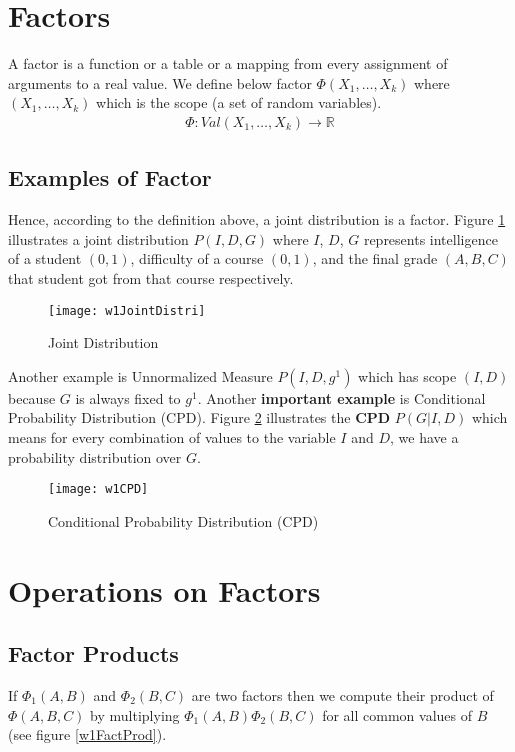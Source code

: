 \section{Factors}
A factor is a function or a table or a mapping from every assignment of arguments to a real value. We define below factor $\Phi(X_1, \ldots, X_k)$ where $(X_1, \ldots, X_k)$ which is the scope (a set of random variables).
\begin{align}
\Phi: Val(X_1, \ldots, X_k) \rightarrow \mathbb{R}
\end{align}

\subsection{Examples of Factor}
Hence, according to the definition above, a joint distribution is a factor. Figure \ref{w1JointDistri} illustrates a joint distribution $P(I,D,G)$ where $I$, $D$, $G$ represents intelligence of a student $(0, 1)$, difficulty of a course $(0,1)$, and the final grade $(A,B,C)$ that student got from that course respectively.
\begin{figure}[!ht]
\centering
\texttt{[image: w1JointDistri]}
\caption{Joint Distribution}
\label{w1JointDistri}
\end{figure}

Another example is Unnormalized Measure $P(I,D,g^1)$ which has scope $(I,D)$ because $G$ is always fixed to $g^1$. Another \textbf{important example} is Conditional Probability Distribution (CPD). Figure \ref{w1CPD} illustrates the \textbf{CPD} $P(G | I, D)$ which means for every combination of values to the variable $I$ and $D$, we have a probability distribution over $G$.  

\begin{figure}[!ht]
\centering
\texttt{[image: w1CPD]}
\caption{Conditional Probability Distribution (CPD)}
\label{w1CPD}
\end{figure}

\section{Operations on Factors}
\subsection{Factor Products}
If $\Phi_1(A,B)$ and $\Phi_2(B,C)$ are two factors then we compute their product of $\Phi(A,B,C)$ by multiplying $\Phi_1(A,B)\Phi_2(B,C)$ for all common values of $B$ (see figure \ref{w1FactProd}).

